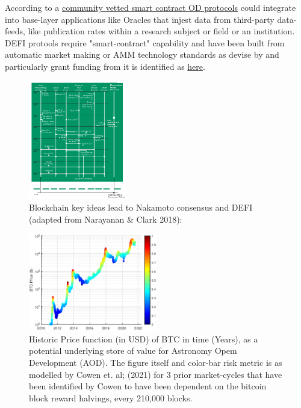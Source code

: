 \documentclass[final,5p,times,twocolumn,authoryear]{elsarticle}
\begin{document}
According to a \href{https://www.fon.hum.uva.nl/rob/Courses/InformationInSpeech/CDROM/Literature/LOTwinterschool2006/szabo.best.vwh.net/smart_contracts_2.html}{community vetted smart contract OD protocols} could integrate into base-layer applications like Oracles that injest data from third-party data-feeds, like publication rates within a research subject or field or an institution. DEFI protools require "smart-contract" capability and have been built from automatic market making or AMM technology standards as devise by  and particularly grant funding from it is identified as  \href{https://queue.acm.org/detail.cfm?id=3136559}{here}.


\begin{figure}
    \centering
    \label{fig:narayanan}
    \includegraphics[width=0.38\textwidth]{narayanan3.png}
    \vspace*{-0.3cm}
    \caption{Blockchain key ideas lead to Nakamoto consensus and DEFI\\ (adapted from Narayanan \& Clark 2018): \href{https://queue.acm.org/detail.cfm?id=3136559}{}}
\end{figure}

 \begin{figure}[h!]
    \centering
    \label{fig:cowenbtc}
  \caption{Historic Price function (in USD) of BTC in time (Years), as a potential underlying store of value for Astronomy Opem Development (AOD). The figure itself and color-bar risk metric is as modelled by Cowen et. al; (2021) for 3 prior market-cycles that have been identified by Cowen to have been dependent on the bitcoin block reward halvings, every 210,000 blocks.}
  \includegraphics[width=0.5\textwidth]{figs/cowenbtc.eps}
\end{figure}
\end{document}
